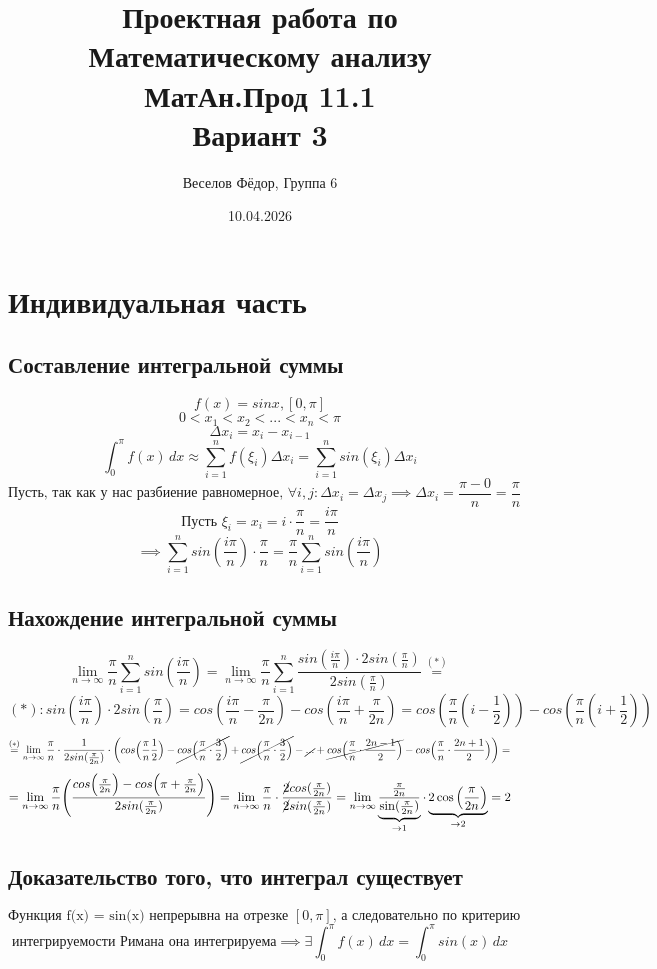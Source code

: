 \documentclass{article}
\title{
Проектная работа по Математическому анализу
\\ МатАн.Прод 11.1
\\ Вариант 3
}
\author{Веселов Фёдор, Группа 6}
\date{10.04.2026}
\begin{document}
\maketitle

\section{Индивидуальная часть}
\subsection{Составление интегральной суммы} 
\[f(x) = sinx, [0, \pi]\]
\[0 < x_1 < x_2 < ... < x_n < \pi\]
\[\Delta x_i = x_i - x_{i-1}\]
\[ \int_0^\pi f(x) \, dx \approx \sum_{i=1}^n f(\xi_i)\Delta x_i = 
\sum_{i=1}^n sin(\xi_i)\Delta x_i \]
\[ \text{Пусть, так как у нас разбиение равномерное, } \forall i,j: 
\Delta x_i = \Delta x_j \implies \Delta x_i = 
\frac{\pi - 0}{n} = \frac{\pi}{n}\]
\[\text{Пусть } \xi_i = x_i = i\cdot\frac{\pi}{n} = \frac{i\pi}{n}\]
\[\implies \sum_{i=1}^n sin(\frac{i\pi}{n})\cdot \frac{\pi}{n}
= \frac{\pi}{n}\sum_{i=1}^n sin(\frac{i\pi}{n})\]
\subsection{Нахождение интегральной суммы}
\[
\lim_{n \to \infty} \frac{\pi}{n}\sum_{i=1}^n sin(\frac{i\pi}{n}) =
\lim_{n \to \infty} \frac{\pi}{n}\sum_{i=1}^n \frac{sin(\frac{i\pi}{n})\cdot2sin(\frac{\pi}{n})}{2sin(\frac{\pi}{n})} \overset{(*)}{=}
\]
\[
(*): sin(\frac{i\pi}{n})\cdot2sin(\frac{\pi}{n}) = 
cos(\frac{i\pi}{n} - \frac{\pi}{2n}) - cos(\frac{i\pi}{n} + \frac{\pi}{2n})
= cos(\frac{\pi}{n}(i-\frac{1}{2})) - cos(\frac{\pi}{n}(i+\frac{1}{2}))
\]
\[
\overset{(*)}{=} \lim_{n \to \infty} \frac{\pi}{n}\cdot\frac{1}{2sin(\frac{\pi}{2n})}\cdot
\biggl(cos\Bigl(\frac{\pi}{n}\frac{1}{2}\Bigr) - \cancel{cos\Bigl(\frac{\pi}{n}\cdot\frac{3}{2}\Bigr)} + \cancel{cos\Bigl(\frac{\pi}{n}\cdot\frac{3}{2}\Bigr)}
- \cancel{...} + \cancel{cos\Bigl(\frac{\pi}{n}\cdot\frac{2n-1}{2}\Bigr)} - cos\Bigl(\frac{\pi}{n}\cdot\frac{2n+1}{2}\Bigr)\biggr) =
\]
\[
= \lim_{n \to \infty} \frac{\pi}{n}\Biggl( 
\frac{cos\Bigl(\frac{\pi}{2n}\Bigr) - cos\Bigl(\pi+\frac{\pi}{2n}\Bigr)}{2sin(\frac{\pi}{2n})} \Biggr) =
\lim_{n \to \infty} \frac{\pi}{n} \cdot 
\frac{\cancel{2}cos(\frac{\pi}{2n})}{\cancel{2}sin(\frac{\pi}{2n})}
= \lim_{n \to \infty} \underbrace{\frac{\frac{\pi}{2n}}{\sin(\frac{\pi}{2n})}}_{\to1} \cdot 
\underbrace{2\cos\left(\frac{\pi}{2n}\right)}_{\to 2} = 2
\]
\subsection{Доказательство того, что интеграл существует}
\[\text{Функция f(x) = sin(x) непрерывна на отрезке } [0,\pi] \text{, а следовательно по критерию}\]
\[\text{интегрируемости Римана она интегрируема} \implies 
\exists \int_0^\pi f(x) \, dx =  \int_0^\pi sin(x) \, dx \]
\end{document}
